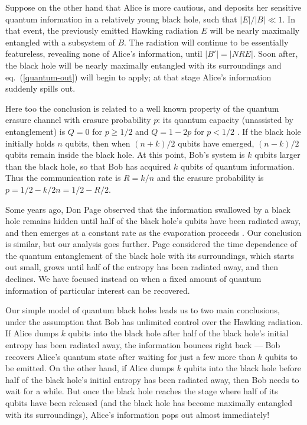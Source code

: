 \documentclass[12pt]{article}
\begin{document}
Suppose on the other hand that Alice is more cautious, and deposits her sensitive quantum information in a relatively young black hole, such that $|E|/|B| \ll 1$. In that event, the previously emitted Hawking radiation $E$ will be nearly maximally entangled with a subsystem of $B$. The radiation will continue to be essentially featureless, revealing none of Alice's information, until $|B'|=|NRE|$. Soon after, the black hole will be nearly maximally entangled with its surroundings and eq.~(\ref{quantum-out}) will begin to apply; at that stage Alice's information suddenly spills out. 

Here too the conclusion is related to a well known property of the quantum erasure channel with erasure probability $p$: its quantum capacity (unassisted by entanglement) is $Q=0$ for $p\ge 1/2$ and $Q=1-2p$ for $p < 1/2$ \cite{quantum-erasure}. If the black hole initially holds $n$ qubits, then when $(n+k)/2$ qubits have emerged, $(n-k)/2$ qubits remain inside the black hole. At this point, Bob's system is $k$ qubits larger than the black hole, so that Bob has acquired $k$ qubits of quantum information.  Thus the communication rate is $R=k/n$ and the erasure probability is $p= 1/2 -k/2n=1/2 - R/2$.

Some years ago, Don Page observed that the information swallowed by a black hole remains hidden until half of the black hole's qubits have been radiated away, and then emerges at a constant rate as the evaporation proceeds \cite{page-entropy}. Our conclusion is similar, but our analysis goes further. Page considered the time dependence of the quantum entanglement of the black hole with its surroundings, which starts out small, grows until half of the entropy has been radiated away, and then declines. We have focused instead on when a fixed amount of quantum information of particular interest can be recovered.

Our simple model of quantum black holes leads us to two main conclusions, under the assumption that Bob has unlimited control over the Hawking radiation. If Alice dumps $k$ qubits into the black hole after half of the black hole's initial entropy has been radiated away, the information bounces right back --- Bob recovers Alice's quantum state after waiting for just a few more than $k$ qubits to be emitted. On the other hand, if Alice dumps $k$ qubits into the black hole before half of the black hole's initial entropy has been radiated away, then Bob needs to wait for a while. But once the black hole reaches the stage where half of its qubits have been released (and the black hole has become maximally entangled with its surroundings), Alice's information pops out almost immediately!
\end{document}
